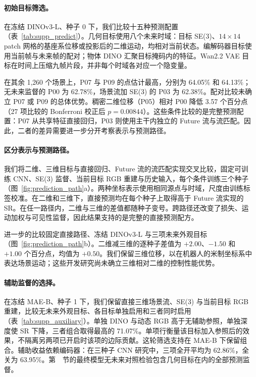 \paragraph{初始目标筛选。}
在冻结 DINOv3-L、种子 0 下，我们比较十五种预测配置（表~\ref{tab:supp_predict}）。几何目标使用八个未来时域：目标 SE(3)、$14\times14$ patch 网格的基座系位移或投影后的二维运动，均相对当前状态。编解码器目标使用当前帧与未来帧的配对；物体 DINO 汇聚目标掩码内的特征。Wan2.2 VAE 目标在时间上压缩九帧片段，并非每个时域各对应一个隐变量。

在其余 1{,}260 个场景上，P07 与 P09 的点估计最高，分别为 64.05\% 和 64.13\%；无未来监督的 P00 为 62.78\%，场景流加 SE(3) 的 P03 为 62.38\%。配对比较未确立 P07 或 P09 的总体优势。稠密二维位移（P05）相对 P00 降低 3.57 个百分点（27 项比较的 Bonferroni 校正后 $p=0.00844$）。这些条件比较的是完整预测配置：P07 从共享特征直接回归，P03 则使用主干内独立的 Future 流与流匹配。因此，二者的差异需要进一步分开考察表示与预测路径。


\paragraph{区分表示与预测路径。}
我们将二维、三维目标与直接回归、Future 流的流匹配实现交叉比较，固定可训练 CNN、SE(3) 监督、当前目标 RGB 重建与历史输入，每个条件训练三个种子（图~\ref{fig:prediction_path}a）。两种坐标表示使用相同源点与时域，尺度由训练标签校准。在二维和三维下，直接预测均在每个种子上取得高于 Future 流实现的 SR。在任一路径内，二维与三维的差值都随种子变号。跨路径还改变了损失、运动加权与可见性监督，因此结果支持的是完整的直接预测配方。

进一步的比较固定直接路径、冻结 DINOv3-L 与三项未来外观目标（图~\ref{fig:prediction_path}b）。二维减三维的逐种子差值为 $+2.00$、$-1.50$ 和 $+1.00$ 个百分点，均值为 $+0.50$。我们保留三维位移，以在机器人的米制坐标系中表达场景运动；这些开发研究尚未确立三维相对二维的控制性能优势。


\paragraph{辅助监督的选择。}
在冻结 MAE-B、种子 1 下，我们保留直接三维场景流、SE(3) 与当前目标 RGB 重建，比较无未来外观目标、各目标单独启用和三者同时启用（表~\ref{tab:supp_auxiliary}）。单独 DINO 与动态 RGB 高于无辅助参照，单独深度使 SR 下降，三者组合取得最高的 71.07\%。单项行衡量该目标加入参照后的效果，不隔离另两项已开启时该项的边际贡献。这轮筛选支持在 MAE-B 下保留组合。辅助收益依赖编码器：在三种子 CNN 研究中，三项全开平均为 62.86\%，全关为 63.95\%。第~~节的最终模型无未来对照检验包含几何目标在内的全部预测监督。

